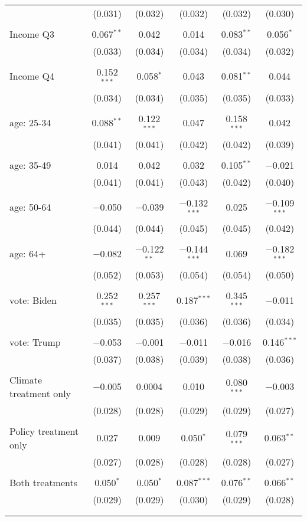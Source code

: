 \begin{tabular}{@{\extracolsep{5pt}}lccccc}
  & (0.031) & (0.032) & (0.032) & (0.032) & (0.030) \\ 
  & & & & & \\ 
 Income Q3 & 0.067$^{**}$ & 0.042 & 0.014 & 0.083$^{**}$ & 0.056$^{*}$ \\ 
  & (0.033) & (0.034) & (0.034) & (0.034) & (0.032) \\ 
  & & & & & \\ 
 Income Q4 & 0.152$^{***}$ & 0.058$^{*}$ & 0.043 & 0.081$^{**}$ & 0.044 \\ 
  & (0.034) & (0.034) & (0.035) & (0.035) & (0.033) \\ 
  & & & & & \\ 
 age: 25-34 & 0.088$^{**}$ & 0.122$^{***}$ & 0.047 & 0.158$^{***}$ & 0.042 \\ 
  & (0.041) & (0.041) & (0.042) & (0.042) & (0.039) \\ 
  & & & & & \\ 
 age: 35-49 & 0.014 & 0.042 & 0.032 & 0.105$^{**}$ & $-$0.021 \\ 
  & (0.041) & (0.041) & (0.043) & (0.042) & (0.040) \\ 
  & & & & & \\ 
 age: 50-64 & $-$0.050 & $-$0.039 & $-$0.132$^{***}$ & 0.025 & $-$0.109$^{***}$ \\ 
  & (0.044) & (0.044) & (0.045) & (0.045) & (0.042) \\ 
  & & & & & \\ 
 age: 64+ & $-$0.082 & $-$0.122$^{**}$ & $-$0.144$^{***}$ & 0.069 & $-$0.182$^{***}$ \\ 
  & (0.052) & (0.053) & (0.054) & (0.054) & (0.050) \\ 
  & & & & & \\ 
 vote: Biden & 0.252$^{***}$ & 0.257$^{***}$ & 0.187$^{***}$ & 0.345$^{***}$ & $-$0.011 \\ 
  & (0.035) & (0.035) & (0.036) & (0.036) & (0.034) \\ 
  & & & & & \\ 
 vote: Trump & $-$0.053 & $-$0.001 & $-$0.011 & $-$0.016 & 0.146$^{***}$ \\ 
  & (0.037) & (0.038) & (0.039) & (0.038) & (0.036) \\ 
  & & & & & \\ 
 Climate treatment only & $-$0.005 & 0.0004 & 0.010 & 0.080$^{***}$ & $-$0.003 \\ 
  & (0.028) & (0.028) & (0.029) & (0.029) & (0.027) \\ 
  & & & & & \\ 
 Policy treatment only & 0.027 & 0.009 & 0.050$^{*}$ & 0.079$^{***}$ & 0.063$^{**}$ \\ 
  & (0.027) & (0.028) & (0.028) & (0.028) & (0.027) \\ 
  & & & & & \\ 
 Both treatments & 0.050$^{*}$ & 0.050$^{*}$ & 0.087$^{***}$ & 0.076$^{**}$ & 0.066$^{**}$ \\ 
  & (0.029) & (0.029) & (0.030) & (0.029) & (0.028) \\ 
  & & & & & \\ 
\hline \\[-1.8ex] 


\end{tabular}
